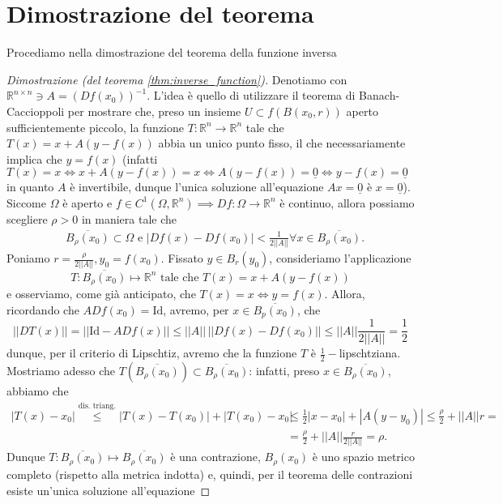 \section{Dimostrazione del teorema}
Procediamo nella dimostrazione del teorema della funzione inversa
\begin{proof}[Dimostrazione (del teorema \ref{thm:inverse_function})]
	Denotiamo con $\mathbb{R}^{n \times n} \ni A = (Df(x_0))^{-1}$. L'idea è quello di utilizzare il teorema di Banach-Caccioppoli per mostrare che, preso un insieme $U \subset f(B(x_0, r))$ aperto sufficientemente piccolo, la funzione $T: \mathbb{R}^n \to \mathbb{R}^n$ tale che $T(x) = x + A(y - f(x))$ abbia un unico punto fisso, il che necessariamente implica che $y = f(x)$ (infatti $T(x) = x \iff x + A(y-f(x)) = x \iff A(y-f(x)) = \underline{0} \iff y - f(x) = \underline{0}$ in quanto $A$ è invertibile, dunque l'unica soluzione all'equazione $Ax = \underline{0}$ è $x = \underline{0}$). \\
	Siccome $\Omega$ è aperto e $f \in C^1(\Omega, \mathbb{R}^n) \implies Df: \Omega \to \mathbb{R}^n$ è continuo, allora possiamo scegliere $\rho > 0$ in maniera tale che
	\begin{align*}
	&\overline{B_{\rho}(x_0)} \subset \Omega \text{    e    } |Df(x) - Df(x_0)| < \frac{1}{2 || A ||} \forall x \in \overline{B_\rho(x_0)}.
	\end{align*}
	Poniamo $r = \frac{\rho}{2 || A ||}, y_0 = f(x_0)$. Fissato $y \in B_r(y_0)$, consideriamo l'applicazione
	$$
	T : \overline{B_{\rho}(x_0)} \mapsto \mathbb{R}^n \text{ tale che } 	T(x) = x + A(y-f(x))
	$$
	e osserviamo, come già anticipato, che $T(x) = x \iff y=f(x)$. Allora, ricordando che $ADf(x_0) = \text{Id}$, avremo, per $x \in \overline{B_p(x_0)}$, che
	$$
	|| DT(x) || = || \text{Id} - ADf(x) ||  \leq || A || \, || Df(x) - Df(x_0) || \leq || A || \frac{1}{2 || A ||} = \frac{1}{2}
	$$
	dunque, per il criterio di Lipschtiz, avremo che la funzione $T$ è $\frac{1}{2}-$lipschtziana. Mostriamo adesso che $T(\overline{B_\rho(x_0)}) \subset \overline{B_\rho(x_0)}$: infatti, preso $x \in \overline{B_\rho(x_0)}$, abbiamo che
	\begin{align*}
	|T(x) - x_0| \stackrel{\text{dis. triang.}}{\leq} |T(x) - T(x_0)| + |T(x_0) - x_0| &\leq \frac{1}{2} |x-x_0| + |A(y - y_0)| \leq \frac{\rho}{2} + || A || r = \\
	&=\frac{\rho}{2} + || A || \frac{r}{2 || A ||} = \rho.
	\end{align*}
	Dunque $T : \overline{B_\rho(x_0)} \mapsto \overline{B_\rho(x_0)}$ è una contrazione, $B_\rho(x_0)$ è uno spazio metrico completo (rispetto alla metrica indotta) e, quindi, per il teorema delle contrazioni esiste un'unica soluzione all'equazione

\end{proof}
